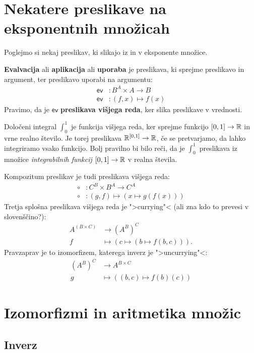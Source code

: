 \section{Nekatere preslikave na eksponentnih množicah}

Poglejmo si nekaj preslikav, ki slikajo iz in v eksponente množice.

\textbf{Evalvacija} ali \textbf{aplikacija} ali \textbf{uporaba} je preslikava, ki sprejme preslikavo in argument, ter preslikavo uporabi na argumentu:
%
\begin{align*}
  \mathsf{ev} &: B^A \times A \to B \\
  \mathsf{ev} &: (f, x) \mapsto f(x)
\end{align*}
%
Pravimo, da je $\mathsf{ev}$ \textbf{preslikava višjega reda}, ker slika preslikave v vrednosti.

\begin{primer}
  Določeni integral $\int_0^1$ je funkcija višjega reda, ker
  sprejme funkcijo $[0,1] \to \mathbb{R}$ in vrne realno število. Je torej preslikava
  $\mathbb{R}^{[0,1]} \to \mathbb{R}$, če se pretvarjamo, da lahko integriramo vsako funkcijo.
  Bolj pravilno bi bilo reči, da je $\int_0^1$ preslikava iz množice \emph{integrabilnih funkcij $[0,1] \to \mathbb{R}$} v realna števila.
\end{primer}

Kompozitum preslikav je tudi preslikava višjega reda:
%
\begin{align*}
    {\circ} &: C^B \times B^A \to C^A \\
    {\circ} &: (g, f) \mapsto (x \mapsto g(f(x)))
\end{align*}
%
Tretja splošna preslikava višjega reda je ">currying"< (ali zna kdo to prevesi v slovenščino?):
%
\begin{align*}
  A^{(B \times C)} &\to (A^B)^C \\
  f &\mapsto (c \mapsto (b \mapsto f(b, c))).
\end{align*}
%
Pravzaprav je to izomorfizem, katerega inverz je ">uncurrying"<:
%
\begin{align*}
  (A^B)^C &\to A^{B \times C} \\
  g       &\mapsto ((b, c) \mapsto f(b)(c))
\end{align*}


\section{Izomorfizmi in aritmetika množic}

\subsection{Inverz}

